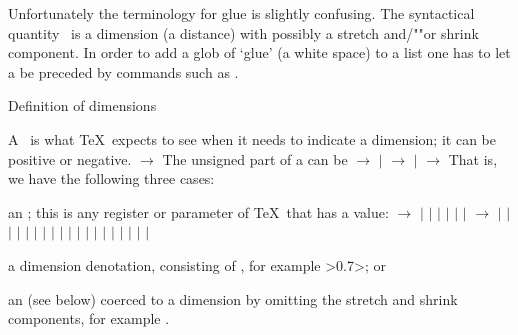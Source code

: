 Unfortunately the terminology for glue is slightly confusing.
The syntactical quantity~ is a dimension (a distance) with
possibly a stretch and/""or shrink component.
In order to add a glob of `glue' (a white space) to a list one has to
let a  be preceded by commands such as .


\spoint Definition of dimensions

A~ is what \TeX\ expects to see when
it needs to indicate a dimension; it can be positive or negative.
\disp{} $\longrightarrow$ %
     \dispstop
The unsigned part of a  can be
\disp{} $\longrightarrow$ 
     $|$ \nl
      $\longrightarrow$ 
     $|$ \nl
      $\longrightarrow$ 
     \dispstop
That is, we have the following three cases:
\itemlist \item an ; this is
 any register or parameter of \TeX\ that has a  value:
 \disp\PopIndentLevel{} $\longrightarrow$
      \nl
      \indent $|$  $|$ \nl
      \indent $|$  $|$ \nl
      \indent $|$ \nl
      \indent $|$ \nl
       $\longrightarrow$ \nl
      \indent $|$  $|$ \nl
      \indent $|$  $|$ \nl
      \indent $|$  $|$  $|$ \nl
      \indent $|$  $|$ \nl
      \indent $|$  $|$ \nl
      \indent $|$  $|$ \nl
      \indent $|$  $|$ \nl
      \indent $|$  $|$ \nl
      \indent $|$  $|$ 
      \>
\item  a dimension denotation, 
 consisting of ,
 for example \ver>0.7\vsize>; or
\item an  (see below) 
 coerced to a dimension by omitting
 the stretch and shrink components, for example .
\itemliststop

